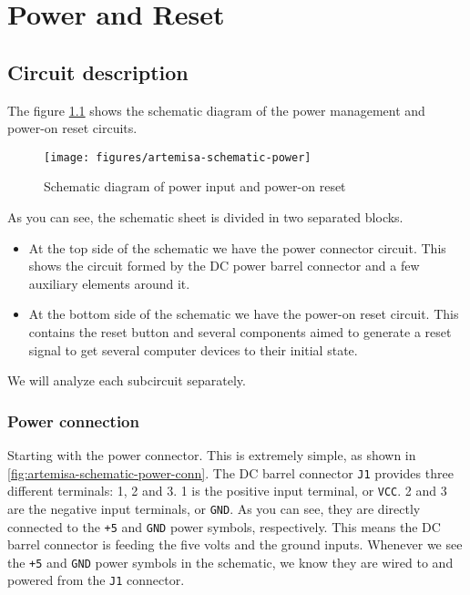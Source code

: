 \chapter{Power and Reset}

\section{Circuit description}

The figure \ref{fig:artemisa-schematic-power} shows the schematic diagram of the power management and power-on reset circuits.

\begin{figure}[htbp]
  \centering
  \texttt{[image: figures/artemisa-schematic-power]}
  \caption{Schematic diagram of power input and power-on reset}
  \label{fig:artemisa-schematic-power}
\end{figure}

As you can see, the schematic sheet is divided in two separated blocks.

\begin{itemize}
  \item At the top side of the schematic we have the power connector circuit. This shows the circuit formed by the DC power barrel connector and a few auxiliary elements around it.
  \item At the bottom side of the schematic we have the power-on reset circuit. This contains the reset button and several components aimed to generate a reset signal to get several computer devices to their initial state.
\end{itemize}

We will analyze each subcircuit separately.

\subsection{Power connection}

Starting with the power connector. This is extremely simple, as shown in \ref{fig:artemisa-schematic-power-conn}. The DC barrel connector {\tt J1} provides three different terminals: 1, 2 and 3. 1 is the positive input terminal, or {\tt VCC}. 2 and 3 are the negative input terminals, or {\tt GND}. As you can see, they are directly connected to the {\tt +5} and {\tt GND} power symbols, respectively. This means the DC barrel connector is feeding the five volts and the ground inputs. Whenever we see the {\tt +5} and {\tt GND} power symbols in the schematic, we know they are wired to and powered from the {\tt J1} connector.

